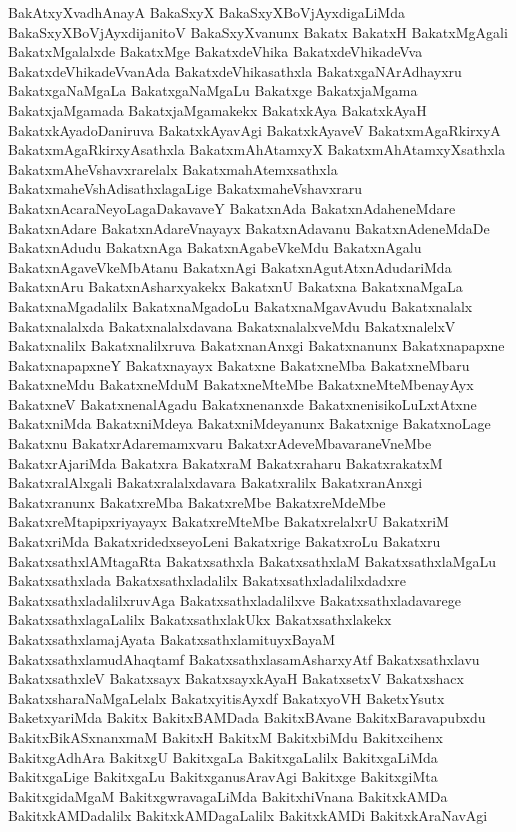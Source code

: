 {BakAtxyXvadhAnayA
BakaSxyX
BakaSxyXBoVjAyxdigaLiMda
BakaSxyXBoVjAyxdijanitoV
BakaSxyXvanunx
Bakatx
BakatxH
BakatxMgAgali
BakatxMgalalxde
BakatxMge
BakatxdeVhika
BakatxdeVhikadeVva
BakatxdeVhikadeVvanAda
BakatxdeVhikasathxla
BakatxgaNArAdhayxru
BakatxgaNaMgaLa
BakatxgaNaMgaLu
Bakatxge
BakatxjaMgama
BakatxjaMgamada
BakatxjaMgamakekx
BakatxkAya
BakatxkAyaH
BakatxkAyadoDaniruva
BakatxkAyavAgi
BakatxkAyaveV
BakatxmAgaRkirxyA
BakatxmAgaRkirxyAsathxla
BakatxmAhAtamxyX
BakatxmAhAtamxyXsathxla
BakatxmAheVshavxrarelalx
BakatxmahAtemxsathxla
BakatxmaheVshAdisathxlagaLige
BakatxmaheVshavxraru
BakatxnAcaraNeyoLagaDakavaveY
BakatxnAda
BakatxnAdaheneMdare
BakatxnAdare
BakatxnAdareVnayayx
BakatxnAdavanu
BakatxnAdeneMdaDe
BakatxnAdudu
BakatxnAga
BakatxnAgabeVkeMdu
BakatxnAgalu
BakatxnAgaveVkeMbAtanu
BakatxnAgi
BakatxnAgutAtxnAdudariMda
BakatxnAru
BakatxnAsharxyakekx
BakatxnU
Bakatxna
BakatxnaMgaLa
BakatxnaMgadalilx
BakatxnaMgadoLu
BakatxnaMgavAvudu
Bakatxnalalx
Bakatxnalalxda
Bakatxnalalxdavana
BakatxnalalxveMdu
BakatxnalelxV
Bakatxnalilx
Bakatxnalilxruva
BakatxnanAnxgi
Bakatxnanunx
Bakatxnapapxne
BakatxnapapxneY
Bakatxnayayx
Bakatxne
BakatxneMba
BakatxneMbaru
BakatxneMdu
BakatxneMduM
BakatxneMteMbe
BakatxneMteMbenayAyx
BakatxneV
BakatxnenalAgadu
Bakatxnenanxde
BakatxnenisikoLuLxtAtxne
BakatxniMda
BakatxniMdeya
BakatxniMdeyanunx
Bakatxnige
BakatxnoLage
Bakatxnu
BakatxrAdaremamxvaru
BakatxrAdeveMbavaraneVneMbe
BakatxrAjariMda
Bakatxra
BakatxraM
Bakatxraharu
BakatxrakatxM
BakatxralAlxgali
Bakatxralalxdavara
Bakatxralilx
BakatxranAnxgi
Bakatxranunx
BakatxreMba
BakatxreMbe
BakatxreMdeMbe
BakatxreMtapipxriyayayx
BakatxreMteMbe
BakatxrelalxrU
BakatxriM
BakatxriMda
BakatxridedxseyoLeni
Bakatxrige
BakatxroLu
Bakatxru
BakatxsathxlAMtagaRta
Bakatxsathxla
BakatxsathxlaM
BakatxsathxlaMgaLu
Bakatxsathxlada
Bakatxsathxladalilx
Bakatxsathxladalilxdadxre
BakatxsathxladalilxruvAga
Bakatxsathxladalilxve
Bakatxsathxladavarege
BakatxsathxlagaLalilx
BakatxsathxlakUkx
Bakatxsathxlakekx
BakatxsathxlamajAyata
BakatxsathxlamituyxBayaM
BakatxsathxlamudAhaqtamf
BakatxsathxlasamAsharxyAtf
Bakatxsathxlavu
BakatxsathxleV
Bakatxsayx
BakatxsayxkAyaH
BakatxsetxV
Bakatxshacx
BakatxsharaNaMgaLelalx
BakatxyitisAyxdf
BakatxyoVH
BaketxYsutx
BaketxyariMda
Bakitx
BakitxBAMDada
BakitxBAvane
BakitxBaravapubxdu
BakitxBikASxnanxmaM
BakitxH
BakitxM
BakitxbiMdu
Bakitxcihenx
BakitxgAdhAra
BakitxgU
BakitxgaLa
BakitxgaLalilx
BakitxgaLiMda
BakitxgaLige
BakitxgaLu
BakitxganusAravAgi
Bakitxge
BakitxgiMta
BakitxgidaMgaM
BakitxgwravagaLiMda
BakitxhiVnana
BakitxkAMDa
BakitxkAMDadalilx
BakitxkAMDagaLalilx
BakitxkAMDi
BakitxkAraNavAgi
}
